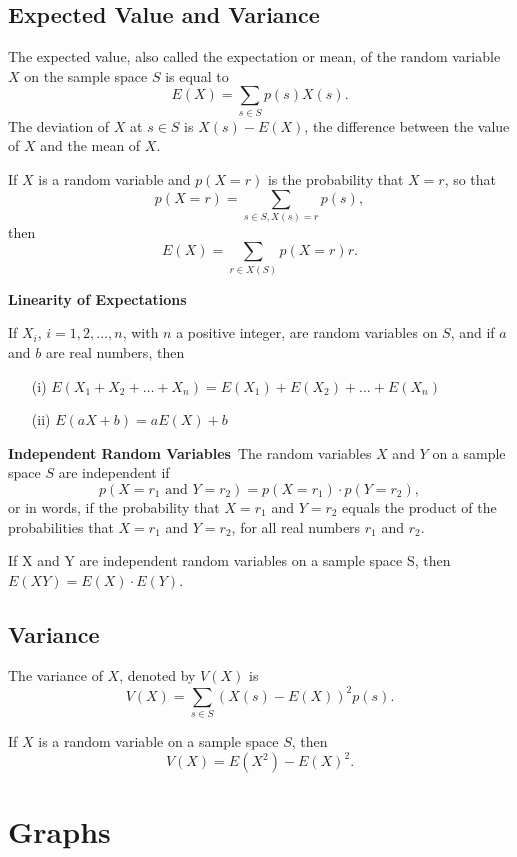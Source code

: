 \documentclass{article}
\begin{document}
\subsection{Expected Value and Variance}
\begin{definition}
    The expected value, also called the expectation or mean, of the random variable \( X \) on the sample space \( S \) is equal to
    \[
    E(X) = \sum_{s \in S} p(s) X(s).
    \]
    The deviation of \( X \) at \( s \in S \) is \( X(s) - E(X) \), the difference between the value of \( X \) and the mean of \( X \).
\end{definition}
\begin{theorem}
    If \( X \) is a random variable and \( p(X = r) \) is the probability that \( X = r \), so that
    \[
    p(X = r) = \sum_{s \in S, X(s) = r} p(s),
    \]
    then
    \[
    E(X) = \sum_{r \in X(S)} p(X = r) r.
    \]
\end{theorem}
\begin{theorem}
    \textbf{Linearity of Expectations}

    If \( X_i \), \( i = 1, 2, \dots, n \), with \( n \) a positive integer, are random variables on \( S \), and if \( a \) and \( b \) are real numbers, then
    \begin{itemize}
        \item[(i)] \( E(X_1 + X_2 + \dots + X_n) = E(X_1) + E(X_2) + \dots + E(X_n) \)
        \item[(ii)] \( E(aX + b) = aE(X) + b \)
    \end{itemize}

\end{theorem}
\begin{definition}
    \textbf{Independent Random Variables}\
    The random variables \( X \) and \( Y \) on a sample space \( S \) are independent if
    \[
    p(X = r_1 \text{ and } Y = r_2) = p(X = r_1) \cdot p(Y = r_2),
    \]
    or in words, if the probability that \( X = r_1 \) and \( Y = r_2 \) equals the product of the probabilities that \( X = r_1 \) and \( Y = r_2 \), for all real numbers \( r_1 \) and \( r_2 \).
\end{definition}
\begin{theorem}
    If X and Y are independent random variables on a sample space S, then \(E(XY) = E(X) \cdot E(Y)\).
\end{theorem}
\subsection{Variance}
\begin{definition}
    The variance of \( X \), denoted by \( V(X) \) is
    \[
    V(X) = \sum_{s \in S} (X(s) - E(X))^2 p(s).
    \]
\end{definition}
\begin{theorem}
    If \( X \) is a random variable on a sample space \( S \), then
    \[
    V(X) = E(X^2) - E(X)^2.
    \]
\end{theorem}
\section{Graphs}








\end{document}
